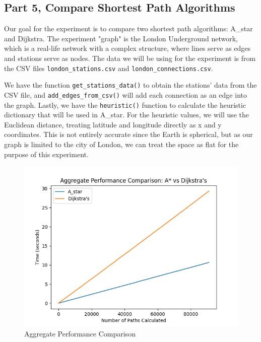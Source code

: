 \documentclass{article}
\begin{document}
\begin{onehalfspace}
\newpage

\section*{Part 5, Compare Shortest Path Algorithms}

Our goal for the experiment is to compare two shortest path algorithms: A\_star and Dijkstra. The experiment "graph" is the London Underground network, which is a real-life network with a complex structure, where lines serve as edges and stations serve as nodes. The data we will be using for the experiment is from the CSV files \texttt{london\_stations.csv} and \texttt{london\_connections.csv}. 



We have the function \texttt{get\_stations\_data()} to obtain the stations' data from the CSV file, and \texttt{add\_edges\_from\_csv()} will add each connection as an edge into the graph. Lastly, we have the \texttt{heuristic()} function to calculate the heuristic dictionary that will be used in A\_star. For the heuristic values, we will use the Euclidean distance, treating latitude and longitude directly as x and y coordinates. This is not entirely accurate since the Earth is spherical, but as our graph is limited to the city of London, we can treat the space as flat for the purpose of this experiment.

\begin{figure}[H]  
\centering
\includegraphics[width=\textwidth]{part5_graph1.png}
\caption{Aggregate Performance Comparison}
\end{figure}


\end{onehalfspace}
\end{document}
